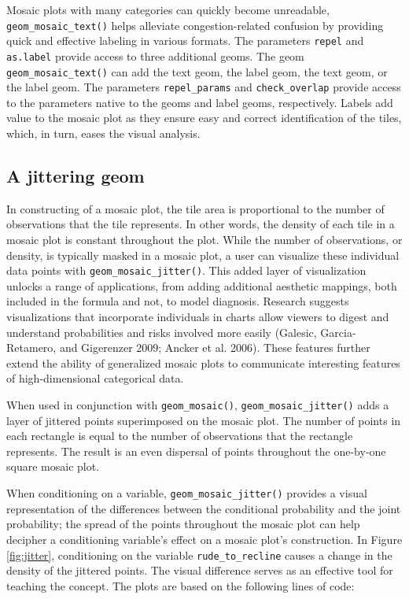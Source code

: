 Mosaic plots with many categories can quickly become unreadable, \texttt{geom\_mosaic\_text()} helps alleviate congestion-related confusion by providing quick and effective labeling in various formats. The parameters \texttt{repel} and \texttt{as.label} provide access to three additional geoms. The geom \texttt{geom\_mosaic\_text()} can add the text geom, the label geom, the  text geom, or the  label geom. The parameters \texttt{repel\_params} and \texttt{check\_overlap} provide access to the parameters native to the  geoms and label geoms, respectively. Labels add value to the mosaic plot as they ensure easy and correct identification of the tiles, which, in turn, eases the visual analysis.

\hypertarget{a-jittering-geom}{%
\subsection*{A jittering geom}\label{a-jittering-geom}}

In constructing of a mosaic plot, the tile area is proportional to the number of observations that the tile represents. In other words, the density of each tile in a mosaic plot is constant throughout the plot. While the number of observations, or density, is typically masked in a mosaic plot, a user can visualize these individual data points with \texttt{geom\_mosaic\_jitter()}. This added layer of visualization unlocks a range of applications, from adding additional aesthetic mappings, both included in the formula and not, to model diagnosis. Research suggests visualizations that incorporate individuals in charts allow viewers to digest and understand probabilities and risks involved more easily (Galesic, Garcia-Retamero, and Gigerenzer 2009; Ancker et al. 2006). These features further extend the ability of generalized mosaic plots to communicate interesting features of high-dimensional categorical data.

When used in conjunction with \texttt{geom\_mosaic()}, \texttt{geom\_mosaic\_jitter()} adds a layer of jittered points superimposed on the mosaic plot. The number of points in each rectangle is equal to the number of observations that the rectangle represents. The result is an even dispersal of points throughout the one-by-one square mosaic plot.

When conditioning on a variable, \texttt{geom\_mosaic\_jitter()} provides a visual representation of the differences between the conditional probability and the joint probability; the spread of the points throughout the mosaic plot can help decipher a conditioning variable's effect on a mosaic plot's construction. In Figure \ref{fig:jitter}, conditioning on the variable \texttt{rude\_to\_recline} causes a change in the density of the jittered points. The visual difference serves as an effective tool for teaching the concept. The plots are based on the following lines of code:

